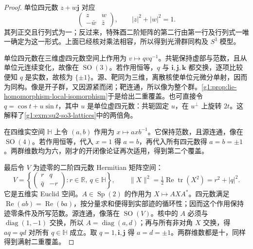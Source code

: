 \begin{proof}
	单位四元数 \(z+w\mathbf j\) 对应
	\[
		\begin{pmatrix}z&w\\-\bar w&\bar z\end{pmatrix},\qquad |z|^2+|w|^2=1.
	\]
	其列正交且行列式为一；反过来，特殊酉二阶矩阵的第二行由第一行及行列式一唯一确定为这一形式。上面已经核对乘法相容，所以得到光滑群同构及 \(S^3\) 模型。

	单位四元数在三维虚四元数空间上作用为 \(v\mapsto qvq^{-1}\)。共轭保持虚部与范数，且从单位元连续变化，故像在 \(\operatorname{SO}(3)\)。若作用恒等，\(q\) 与 \(\mathbf i,\mathbf j,\mathbf k\) 都交换，逐项比较便知 \(q\) 是实数，故核为 \(\{\pm1\}\)。源、靶同为三维，离散核使单位元微分单射，因而为同构。像是开子群，又因源紧而闭；靶连通，所以像为整个群。\cref{g1:prop:lie-homomorphism-local-isomorphism}于是给出二重覆盖。也可直接令 \(q=\cos t+u\sin t\)，其中 \(u\) 是单位虚四元数：共轭固定 \(u\)，在 \(u^\perp\) 上旋转 \(2t\)。这解释了\cref{g1:exm:su2-so3-lattices}中的两倍角。

	在四维实空间 \(\mathbb H\) 上令 \((a,b)\) 作用为 \(x\mapsto axb^{-1}\)。它保持范数，且源连通，像在 \(\operatorname{SO}(4)\)。若作用恒等，代入 \(x=1\) 得 \(a=b\)，再代入所有四元数得 \(a=b=\pm1\)。两群维数均为六，刚才的开闭像论证再次适用，得到第二个覆盖。

	最后令 \(V\) 为迹零的二阶四元数 Hermitian 矩阵空间：
	\[
		V=\left\{\begin{pmatrix}r&q\\\bar q&-r\end{pmatrix}:r\in\mathbb R,\ q\in\mathbb H\right\},\qquad
		\|X\|^2=\tfrac12\operatorname{Re}\operatorname{tr}(X^2)=r^2+|q|^2.
	\]
	它是五维实 Euclid 空间。\(A\in\operatorname{Sp}(2)\) 的作用为 \(X\mapsto AXA^*\)。四元数满足 \(\operatorname{Re}(ab)=\operatorname{Re}(ba)\)，按分量求和便得到实部迹的循环性；因而这个作用保持迹零条件及所写范数。源连通，像落在 \(\operatorname{SO}(V)\)。核中的 \(A\) 必须与 \(\operatorname{diag}(1,-1)\) 交换，所以 \(A=\operatorname{diag}(a,d)\)；再与所有非对角 \(X\) 交换，得 \(aq=qd\) 对所有 \(q\in\mathbb H\) 成立。取 \(q=1,\mathbf i,\mathbf j\) 得 \(a=d=\pm1\)。两群维数都是十，同样得到满射二重覆盖。
\end{proof}

